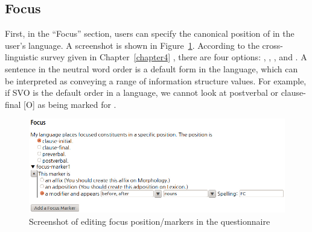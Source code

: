 \subsection{Focus}
\label{11:ssec:questionnaire-focus}


First, in the ``Focus'' section, users can specify the canonical
position of  in the user's language. A screenshot is shown in
Figure~\ref{screenshot:focus}.  According to the cross-linguistic
survey given in Chapter~\ref{chapter4}
, there are four options:
, , , and
.  A sentence in the neutral word order is a default
form in the language, which can be interpreted as conveying a range of
information structure values. For example, if SVO is the default order
in a language, we cannot look at postverbal or clause-final [O] as
being marked for
.



\begin{figure}[!t]
\begin{center} 
\includegraphics[width=.9\textwidth]{screenshot/focus.jpg}
\caption{Screenshot of editing focus position/markers in the questionnaire}
\label{screenshot:focus}
\end{center}
\end{figure}


